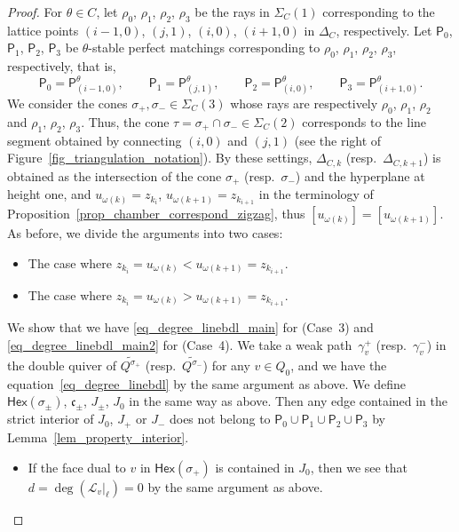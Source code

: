 \documentclass[pdftex]{sigma}
\numberwithin{equation}{section}
\theoremstyle{definition}
\newcommand{\calL}{\mathcal{L}}
\newcommand{\fkc}{\mathfrak{c}}
\newcommand{\sfP}{\mathsf{P}}
\newcommand{\Hex}{\mathsf{Hex}}
\newcommand{\permII}{\omega}
\begin{document}
\begin{proof}
For $\theta\in C$, let $\rho_0$, $\rho_1$, $\rho_2$, $\rho_3$ be the rays in $\Sigma_C(1)$ corresponding to the lattice points
$(i-1,0)$, $(j,1)$, $(i,0)$, $(i+1,0)$ in $\Delta_C$, respectively.
Let $\sfP_0$, $\sfP_1$, $\sfP_2$, $\sfP_3$ be $\theta$-stable perfect matchings corresponding to $\rho_0$, $\rho_1$, $\rho_2$, $\rho_3$, respectively,
that is,
\[
\sfP_0=\sfP_{(i-1,0)}^\theta, \qquad \sfP_1=\sfP_{(j,1)}^\theta, \qquad \sfP_2=\sfP_{(i,0)}^\theta, \qquad \sfP_3=\sfP_{(i+1,0)}^\theta.
\]
We consider the cones $\sigma_+, \sigma_-\in\Sigma_C(3)$ whose rays are respectively $\rho_0$, $\rho_1$, $\rho_2$ and $\rho_1$, $\rho_2$, $\rho_3$.
Thus, the cone $\tau=\sigma_+\cap\sigma_-\in\Sigma_C(2)$ corresponds to the line segment obtained by connecting $(i,0)$ and $(j,1)$
 (see the right of Figure~\ref{fig_triangulation_notation}).
By these settings, $\Delta_{C,k}$ (resp.\ $\Delta_{C,k+1}$) is obtained as the intersection of the cone $\sigma_+$ (resp.\ $\sigma_-$) and the hyperplane at height one,
and $u_{\permII(k)}=z_{k_i}$, $u_{\permII(k+1)}=z_{k_{i+1}}$ in the terminology of Proposition~\ref{prop_chamber_correspond_zigzag},
thus $[u_{\permII(k)}]= [u_{\permII(k+1)}]$. As before, we divide the arguments into two cases:
\begin{itemize}\setlength{\leftskip}{1cm}\itemsep=0pt
\item[(Case 3)] The case where $z_{k_i}=u_{\permII(k)}<u_{\permII(k+1)}=z_{k_{i+1}}$.
\item[(Case 4)] The case where $z_{k_i}=u_{\permII(k)}>u_{\permII(k+1)}=z_{k_{i+1}}$.
\end{itemize}
We show that we have \eqref{eq_degree_linebdl_main} for (Case~3) and \eqref{eq_degree_linebdl_main2} for (Case~4).
We take a weak path~$\gamma_v^+$ (resp.~$\gamma_v^-$) in the double quiver of $\widetilde{Q^{\sigma_+}}$ (resp.\ $\widetilde{Q^{\sigma_-}}$) for any $v\in Q_0$,
and we have the equation~\eqref{eq_degree_linebdl} by the same argument as above.
We define $\Hex(\sigma_\pm)$, $\fkc_\pm$, $J_\pm$, $J_0$ in the same way as above.
Then any edge contained in the strict interior of $J_0$, $J_+$ or $J_-$ does not belong to $\sfP_0\cup \sfP_1\cup \sfP_2\cup \sfP_3$
by Lemma~\ref{lem_property_interior}.
\begin{itemize}\itemsep=0pt
\item If the face dual to $v$ in $\Hex(\sigma_+)$ is contained in $J_0$, then we see that $d=\deg(\calL_v |_\ell)=0$ by the same argument as above.

\end{itemize}
\end{proof}
\end{document}
